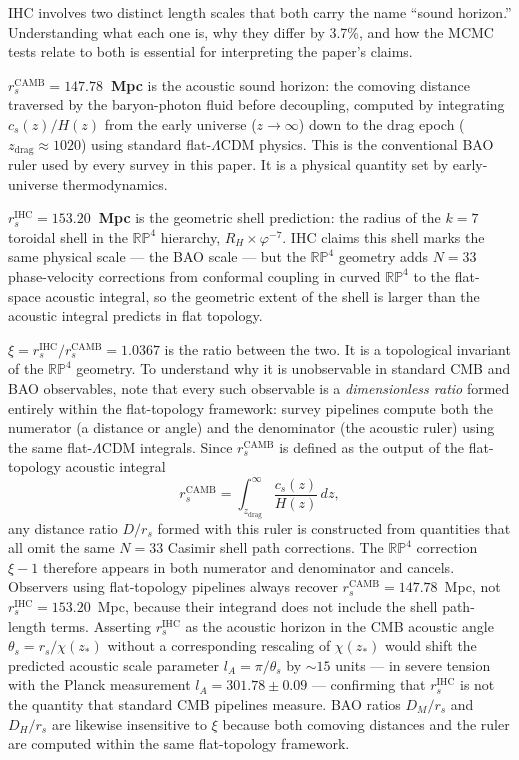 \documentclass[12pt,a4paper]{article}
\begin{document}
IHC involves two distinct length scales that both carry the name ``sound horizon.''
Understanding what each one is, why they differ by 3.7\%, and how the MCMC tests
relate to both is essential for interpreting the paper's claims.

\textbf{$r_s^\mathrm{CAMB} = 147.78$~Mpc} is the acoustic sound horizon: the
comoving distance traversed by the baryon-photon fluid before decoupling,
computed by integrating $c_s(z)/H(z)$ from the early universe ($z\to\infty$) down
to the drag epoch ($z_\mathrm{drag} \approx 1020$) using standard flat-$\Lambda$CDM physics. This is the conventional BAO ruler used by every survey
in this paper. It is a physical quantity set by early-universe thermodynamics.

\textbf{$r_s^\mathrm{IHC} = 153.20$~Mpc} is the geometric shell prediction: the
radius of the $k=7$ toroidal shell in the $\mathbb{RP}^4$ hierarchy,
$R_H \times \varphi^{-7}$. IHC claims this shell marks the same physical scale ---
the BAO scale --- but the $\mathbb{RP}^4$ geometry adds $N=33$ phase-velocity
corrections from conformal coupling in curved $\mathbb{RP}^4$ to the flat-space
acoustic integral, so the geometric extent of the shell is larger than the
acoustic integral predicts in flat topology.

\textbf{$\xi = r_s^\mathrm{IHC}/r_s^\mathrm{CAMB} = 1.0367$} is the ratio between
the two. It is a topological invariant of the $\mathbb{RP}^4$ geometry. To understand
why it is unobservable in standard CMB and BAO observables, note that every such
observable is a \emph{dimensionless ratio} formed entirely within the flat-topology
framework: survey pipelines compute both the numerator (a distance or angle) and the
denominator (the acoustic ruler) using the same flat-$\Lambda$CDM integrals. Since
$r_s^\mathrm{CAMB}$ is defined as the output of the flat-topology acoustic integral
\begin{equation}
  r_s^\mathrm{CAMB} = \int_{z_\mathrm{drag}}^{\infty} \frac{c_s(z)}{H(z)}\,dz,
\end{equation}
any distance ratio $D/r_s$ formed with this ruler is constructed from quantities
that all omit the same $N=33$ Casimir shell path corrections. The $\mathbb{RP}^4$
correction $\xi - 1$ therefore appears in both numerator and denominator and cancels.
Observers using flat-topology pipelines always recover $r_s^\mathrm{CAMB} = 147.78$~Mpc,
not $r_s^\mathrm{IHC} = 153.20$~Mpc, because their integrand does not include the
shell path-length terms. Asserting $r_s^\mathrm{IHC}$ as the acoustic horizon in the
CMB acoustic angle $\theta_s = r_s/\chi(z_*)$ without a corresponding rescaling of
$\chi(z_*)$ would shift the predicted acoustic scale parameter $l_A = \pi/\theta_s$
by ${\sim}15$ units --- in severe tension with the Planck measurement $l_A = 301.78 \pm 0.09$
\citep{Planck2020} --- confirming that $r_s^\mathrm{IHC}$ is not the quantity that
standard CMB pipelines measure. BAO ratios $D_M/r_s$ and $D_H/r_s$ are likewise
insensitive to $\xi$ because both comoving distances and the ruler are computed
within the same flat-topology framework.
\end{document}
